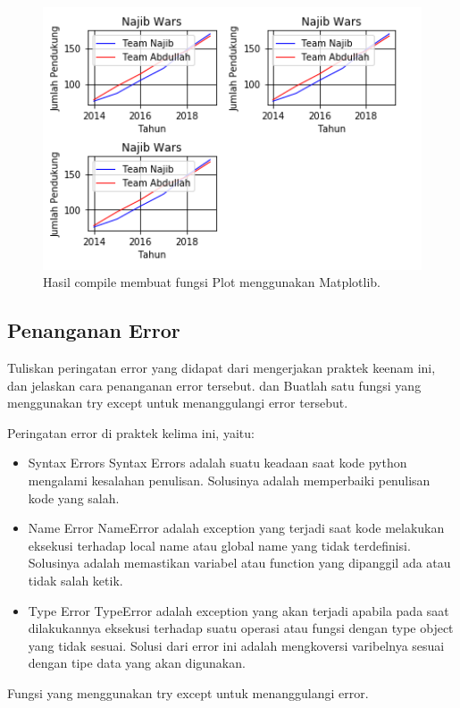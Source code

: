 \begin{figure}[H]
	\includegraphics[width=12cm]{figures/6/1174042/p4.png}
	\centering
	\caption{Hasil compile membuat fungsi Plot menggunakan Matplotlib.}
\end{figure}


\subsection{Penanganan Error}
Tuliskan  peringatan  error  yang  didapat  dari  mengerjakan  praktek  keenam  ini, dan  jelaskan  cara  penanganan  error  tersebut. dan  Buatlah  satu  fungsi  yang menggunakan try except untuk menanggulangi error tersebut.

\hfill \break
Peringatan error di praktek kelima ini, yaitu:
\begin{itemize}
	\item Syntax Errors
	Syntax Errors adalah suatu keadaan saat kode python mengalami kesalahan penulisan. Solusinya adalah memperbaiki penulisan kode yang salah.
	
	\item Name Error
	NameError adalah exception yang terjadi saat kode melakukan eksekusi terhadap local name atau global name yang tidak terdefinisi. Solusinya adalah memastikan variabel atau function yang dipanggil ada atau tidak salah ketik.
	
	\item Type Error
	TypeError adalah exception yang akan terjadi apabila pada saat dilakukannya eksekusi terhadap suatu operasi atau fungsi dengan type object yang tidak sesuai. Solusi dari error ini adalah mengkoversi varibelnya sesuai dengan tipe data yang akan digunakan.
\end{itemize}
\hfill \break
Fungsi yang menggunakan try except untuk menanggulangi error.

